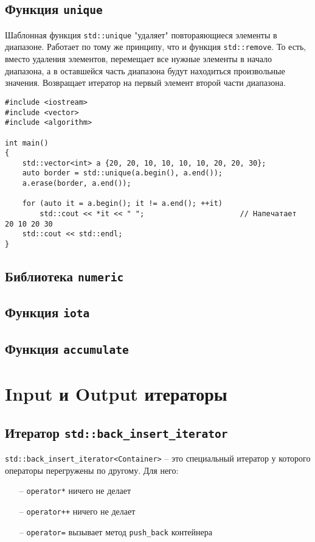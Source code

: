 \documentclass{article}
\begin{document}
\newpage
\subsection*{Функция \texttt{unique}}
Шаблонная функция \texttt{std::unique} "удаляет" повтораяющиеся элементы в диапазоне. Работает по тому же принципу, что и функция \texttt{std::remove}. То есть, вместо удаления элементов, перемещает все нужные элементы в начало диапазона, а в оставшейся часть диапазона будут находиться произвольные значения. Возвращает итератор на первый элемент второй части диапазона.
\begin{lstlisting}
#include <iostream>
#include <vector>
#include <algorithm>

int main()
{
    std::vector<int> a {20, 20, 10, 10, 10, 10, 20, 20, 30};
    auto border = std::unique(a.begin(), a.end());
    a.erase(border, a.end());
    
    for (auto it = a.begin(); it != a.end(); ++it)    
    	std::cout << *it << " ";                      // Напечатает  20 10 20 30
    std::cout << std::endl;
}
\end{lstlisting}

\subsection*{Библиотека \texttt{numeric}}
\subsection*{Функция \texttt{iota}}
\subsection*{Функция \texttt{accumulate}}


\newpage

\section*{Input и Output итераторы}
\subsection*{Итератор \texttt{std::back\_insert\_iterator}}
\texttt{std::back\_insert\_iterator<Container>} -- это специальный итератор у которого операторы перегружены по другому. Для него:
\begin{itemize}
\item[--] \texttt{operator*} ничего не делает
\item[--] \texttt{operator++} ничего не делает
\item[--] \texttt{operator=} вызывает метод \texttt{push\_back} контейнера
\end{itemize}
\end{document}
